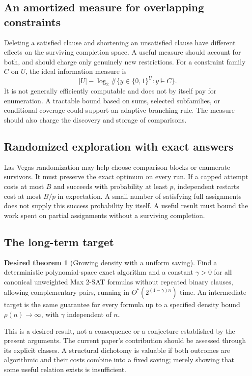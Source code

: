 \documentclass[11pt,a4paper]{article}
\theoremstyle{definition}
\newtheorem{target}[theorem]{Desired theorem}
\theoremstyle{remark}
\newcommand{\Ostar}{O^{*}}
\newcommand{\bits}{\{0,1\}}
\begin{document}
\subsection{An amortized measure for overlapping constraints}

Deleting a satisfied clause and shortening an unsatisfied clause have
different effects on the surviving completion space. A useful measure should
account for both, and should charge only genuinely new restrictions.
For a constraint family $C$ on $U$, the ideal information measure is
\[
 |U|-\log_2\#\{y\in\bits^U:y\models C\}.
\]
It is not generally efficiently computable and does not by itself pay for
enumeration. A tractable bound based on sums, selected subfamilies, or
conditional coverage could support an adaptive branching rule. The measure
should also charge the discovery and storage of comparisons.

\subsection{Randomized exploration with exact answers}

Las Vegas randomization may help choose comparison blocks or enumerate
survivors. It must preserve the exact optimum on every run. If a capped
attempt costs at most $B$ and succeeds with probability at least $p$,
independent restarts cost at most $B/p$ in expectation. A small number of
satisfying full assignments does not supply this success probability by
itself. A useful result must bound the work spent on partial assignments
without a surviving completion.

\subsection{The long-term target}

\begin{target}[Growing density with a uniform saving]\label{target:main}
Find a deterministic polynomial-space exact algorithm and a constant
$\gamma>0$ for all canonical unweighted Max 2-SAT formulas without repeated
binary clauses, allowing complementary pairs, running in
$\Ostar(2^{(1-\gamma)n})$ time.
An intermediate target is the same guarantee for every formula up to a
specified density bound $\rho(n)\to\infty$, with $\gamma$ independent of $n$.
\end{target}

This is a desired result, not a consequence or a conjecture established by
the present arguments. The current paper's contribution should be assessed
through its explicit classes. A structural dichotomy is valuable if both
outcomes are algorithmic and their costs combine into a fixed saving; merely
showing that some useful relation exists is insufficient.
\end{document}
